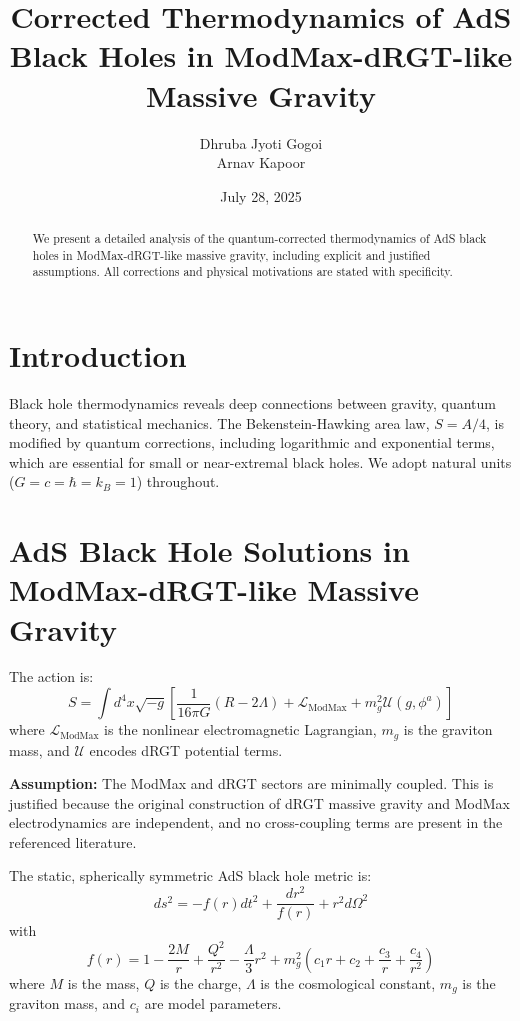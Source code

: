 \documentclass[12pt]{article}
\title{Corrected Thermodynamics of AdS Black Holes in ModMax-dRGT-like Massive Gravity}
\author{Dhruba Jyoti Gogoi \\ Arnav Kapoor}
\date{July 28, 2025}
\begin{document}
\maketitle

\begin{abstract}
We present a detailed analysis of the quantum-corrected thermodynamics of AdS black holes in ModMax-dRGT-like massive gravity, including explicit and justified assumptions. All corrections and physical motivations are stated with specificity.
\end{abstract}

\section{Introduction}
Black hole thermodynamics reveals deep connections between gravity, quantum theory, and statistical mechanics. The Bekenstein-Hawking area law, $S = A/4$, is modified by quantum corrections, including logarithmic and exponential terms, which are essential for small or near-extremal black holes. We adopt natural units ($G = c = \hbar = k_B = 1$) throughout.

\section{AdS Black Hole Solutions in ModMax-dRGT-like Massive Gravity}
The action is:
\begin{equation}
S = \int d^4x \sqrt{-g} \left[ \frac{1}{16\pi G} (R - 2\Lambda) + \mathcal{L}_{\text{ModMax}} + m_g^2 \mathcal{U}(g, \phi^a) \right]
\end{equation}
where $\mathcal{L}_{\text{ModMax}}$ is the nonlinear electromagnetic Lagrangian, $m_g$ is the graviton mass, and $\mathcal{U}$ encodes dRGT potential terms.

\textbf{Assumption:} The ModMax and dRGT sectors are minimally coupled. This is justified because the original construction of dRGT massive gravity and ModMax electrodynamics are independent, and no cross-coupling terms are present in the referenced literature.

The static, spherically symmetric AdS black hole metric is:
\begin{equation}
ds^2 = -f(r) dt^2 + \frac{dr^2}{f(r)} + r^2 d\Omega^2
\end{equation}
with
\begin{equation}
f(r) = 1 - \frac{2M}{r} + \frac{Q^2}{r^2} - \frac{\Lambda}{3} r^2 + m_g^2 (c_1 r + c_2 + \frac{c_3}{r} + \frac{c_4}{r^2})
\end{equation}
where $M$ is the mass, $Q$ is the charge, $\Lambda$ is the cosmological constant, $m_g$ is the graviton mass, and $c_i$ are model parameters.
\end{document}
